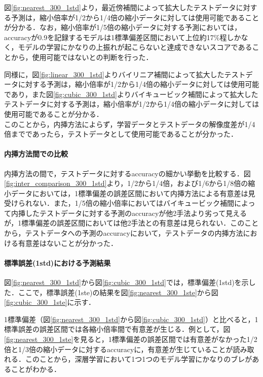 \documentclass[a4j, 11pt]{jreport}
\begin{document}
図\ref{fig:nearest_300_1std}より，最近傍補間によって拡大したテストデータに対する予測は，縮小倍率が1/2から1/4倍の縮小データに対しては使用可能であることが分かる．なお，縮小倍率が1/5倍の縮小データに対する予測においては，accuracyが0.9を記録するモデルは1標準偏差区間において上位約17\%程しかなく，モデルの学習にかなりの上振れが起こらないと達成できないスコアであることから，使用可能ではないとの判断を行った．

同様に，図\ref{fig:linear_300_1std}よりバイリニア補間によって拡大したテストデータに対する予測は，縮小倍率が1/2から1/4倍の縮小データに対しては使用可能であり，また図\ref{fig:cubic_300_1std}よりバイキュービック補間によって拡大したテストデータに対する予測は，縮小倍率が1/2から1/4倍の縮小データに対しては使用可能であることが分かる．\\このことから，内挿方法によらず，学習データとテストデータの解像度差が1/4倍までであったら，テストデータとして使用可能であることが分かった．

\paragraph{内挿方法間での比較}
内挿方法の間で，テストデータに対するaccuracyの細かい挙動を比較する．図\ref{fig:inter_comparison_300_1std}より，1/2から1/4倍，および1/6から1/8倍の縮小データにおいては，1標準偏差の誤差区間において内挿方法による有意差は見受けられない．また，1/5倍の縮小倍率においてはバイキュービック補間によって内挿したテストデータに対する予測のaccuracyが他2手法より劣って見えるが，1標準偏差の誤差区間においては他2手法との有意差は見られない．このことから，テストデータへの予測のaccuracyにおいて，テストデータの内挿方法における有意差はないことが分かった．

\paragraph{標準誤差(1std)における予測結果}
図\ref{fig:nearest_300_1std}から図\ref{fig:cubic_300_1std}では，標準偏差(1std)を示した．ここで，標準誤差(1ste)の結果を図\ref{fig:nearest_300_1ste}から図\ref{fig:cubic_300_1ste}に示す．

1標準偏差（図\ref{fig:nearest_300_1std}から図\ref{fig:cubic_300_1std}）と比べると，1標準誤差の誤差区間では各縮小倍率間で有意差が生じる．例として，図\ref{fig:nearest_300_1ste}を見ると，1標準偏差の誤差区間では有意差がなかった1/2倍と1/3倍の縮小データに対するaccuracyに，有意差が生じていることが読み取れる．このことから，深層学習において1つ1つのモデル学習にかなりのブレがあることがわかる．
\end{document}
